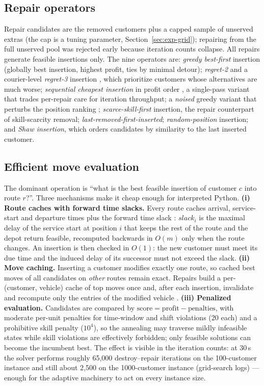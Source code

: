 \documentclass[10pt, a4paper]{article}
\begin{document}
\subsection{Repair operators}
Repair candidates are the removed customers plus a capped sample of
unserved extras (the cap is a tuning parameter,
Section~\ref{sec:exp-grid}); repairing from the full unserved pool was
rejected early because iteration counts collapse. All repairs generate
feasible insertions only. The nine operators are: \emph{greedy best-first}
insertion (globally best insertion, highest profit, ties by minimal
detour); \emph{regret-2} and a courier-level \emph{regret-3} insertion
\cite{ropke2006}, which prioritize customers whose alternatives are much
worse; \emph{sequential cheapest insertion} in profit order
\cite{kovacs2012}, a single-pass variant that trades per-repair care for
iteration throughput; a \emph{noised} greedy variant that perturbs the
position ranking \cite{ropke2006}; \emph{scarce-skill-first} insertion, the
repair counterpart of skill-scarcity removal; \emph{last-removed-first-inserted};
\emph{random-position} insertion; and \emph{Shaw insertion}, which orders
candidates by similarity to the last inserted customer.

\subsection{Efficient move evaluation}\label{sec:eval}
The dominant operation is ``what is the best feasible insertion of customer
$c$ into route $r$?''. Three mechanisms make it cheap enough for
interpreted Python.
\textbf{(i) Route caches with forward time slacks.} Every route caches
arrival, service-start and departure times plus the forward time slack
\cite{savelsbergh1992}: $\mathit{slack}_i$ is the maximal delay of the
service start at position $i$ that keeps the rest of the route and the
depot return feasible, recomputed backwards in $O(m)$ only when the route
changes. An insertion is then checked in $O(1)$: the new customer must meet
its due time and the induced delay of its successor must not exceed the
slack.
\textbf{(ii) Move caching.} Inserting a customer modifies exactly one
route, so cached best moves of all candidates on \emph{other} routes remain
exact. Repairs build a per-(customer, vehicle) cache of top moves once and,
after each insertion, invalidate and recompute only the entries of the
modified vehicle \cite{ropke2006}.
\textbf{(iii) Penalized evaluation.} Candidates are compared by
$\mathrm{score} = \text{profit} - \text{penalties}$, with moderate
per-unit penalties for time-window and shift violations (20 each) and a
prohibitive skill penalty ($10^4$), so the annealing may traverse mildly
infeasible states while skill violations are effectively forbidden; only
feasible solutions can become the incumbent best.
The effect is visible in the iteration counts: at 30\,s the solver performs
roughly 65{,}000 destroy--repair iterations on the 100-customer instance and
still about 2{,}500 on the 1000-customer instance (grid-search logs) ---
enough for the adaptive machinery to act on every instance size.
\end{document}
